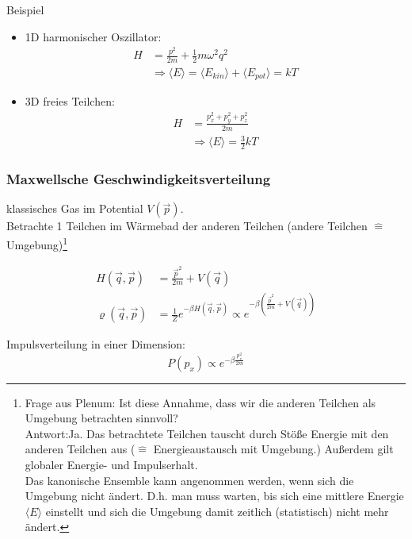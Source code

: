 \begin{beispiel}{Beispiel}
    \begin{itemize}
        \item 1D harmonischer Oszillator:
        \begin{align}
            H &= \frac{p^2}{2m} + \frac{1}{2} m \omega^2 q^2 \\
            &\Rightarrow \langle E \rangle = \langle E_{kin} \rangle + \langle E_{pot} \rangle = k T
        \end{align}
        \item 3D freies Teilchen:
        \begin{align}
            H &= \frac{p_x^2 + p_y^2 + p_z^2}{2 m} \\
            &\Rightarrow \langle E \rangle = \frac{3}{2} k T
        \end{align}
    \end{itemize}
\end{beispiel}



\subsubsection{Maxwellsche Geschwindigkeitsverteilung}
klassisches Gas im Potential $V(\Vec{p}).$\\

Betrachte 1 Teilchen im Wärmebad der anderen Teilchen (andere Teilchen $\widehat{=}$ Umgebung)\footnote{Frage aus Plenum: Ist diese Annahme, dass wir die anderen Teilchen als Umgebung betrachten sinnvoll? \\
Antwort:Ja. Das betrachtete Teilchen tauscht durch Stöße Energie mit den anderen Teilchen aus ($\widehat{=}$ Energieaustausch mit Umgebung.) Außerdem gilt globaler Energie- und Impulserhalt.\\
Das kanonische Ensemble kann angenommen werden, wenn sich die Umgebung nicht ändert. D.h. man muss warten, bis sich eine mittlere Energie $\langle E\rangle$ einstellt und sich die Umgebung damit zeitlich (statistisch) nicht mehr ändert.}

\begin{align}
    H(\Vec{q},\Vec{p}) &= \frac{\Vec{p}^2}{2m} + V(\Vec{q}) \\
    \varrho(\Vec{q},\Vec{p}) &= \frac{1}{Z} e^{- \beta H(\Vec{q},\Vec{p})} \propto e^{- \beta \left(\frac{\Vec{p}^2}{2m} + V(\Vec{q})\right)}
\end{align}

Impulsverteilung in einer Dimension:
\begin{equation}
    P(p_x) \propto e^{- \beta \frac{p_x^2}{2m}}
\end{equation}

